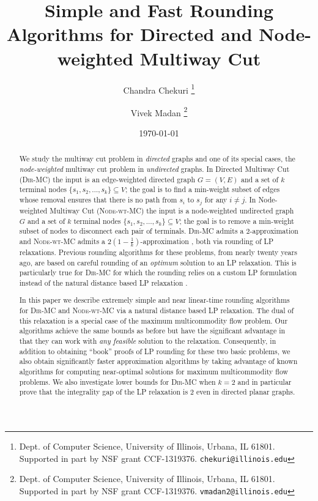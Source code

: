 \documentclass[11pt]{article}
\def\DirMC{\textsc{Dir-MC}\xspace}
\def\NodeMC{\textsc{Node-wt-MC}\xspace}
\def\NodeMC{\textsc{Node-wt-MC}\xspace}
\begin{document}
\title{Simple and Fast Rounding Algorithms for Directed and Node-weighted Multiway Cut}

\author{
Chandra Chekuri
\thanks{
Dept. of Computer Science, University of Illinois, Urbana, IL 61801.
Supported in part by NSF grant CCF-1319376. {\tt chekuri@illinois.edu}}
\and
Vivek Madan
\thanks{
Dept. of Computer Science, University of Illinois, Urbana, IL 61801.
Supported in part by NSF grant CCF-1319376.
{\tt vmadan2@illinois.edu}}
}

\date{\today}

\maketitle

\thispagestyle{empty}
\begin{abstract}
  We study the multiway cut problem in {\em directed} graphs and one
  of its special cases, the {\em node-weighted} multiway cut problem
  in {\em undirected} graphs.  In {\sc Directed Multiway Cut} (\DirMC)
  the input is an edge-weighted directed graph $G=(V,E)$ and a set of
  $k$ terminal nodes $\{s_1,s_2,\ldots,s_k\} \subseteq V$; the goal is
  to find a min-weight subset of edges whose removal ensures that there
  is no path from $s_i$ to $s_j$ for any $i \neq j$. In {\sc
    Node-weighted Multiway Cut} (\NodeMC) the input is a node-weighted
  undirected graph $G$ and a set of $k$ terminal nodes
  $\{s_1,s_2,\ldots,s_k\} \subseteq V$; the goal is to remove a
  min-weight subset of nodes to disconnect each pair of
  terminals. \DirMC admits a $2$-approximation \cite{NaorZ01}
  and \NodeMC admits a $2(1-\frac{1}{k})$-approximation
  \cite{GargVY04}, both via rounding of LP relaxations.
  Previous rounding algorithms for these problems, from nearly twenty
  years ago, are based on careful rounding of an {\em
    optimum} solution to an LP relaxation. This is particularly true
  for \DirMC for which the rounding relies on a custom LP formulation
  instead of the natural distance based LP relaxation \cite{NaorZ01}.

  In this paper we describe extremely simple and near linear-time
  rounding algorithms for \DirMC and \NodeMC via a natural distance
  based LP relaxation. The dual of this relaxation is a special case
  of the maximum  multicommodity flow problem. Our
  algorithms achieve the same bounds as before but have the
  significant advantage in that they can work with {\em any feasible}
  solution to the relaxation. Consequently, in addition to obtaining
  ``book'' proofs of LP rounding for these two basic problems, we also
  obtain significantly faster approximation algorithms by taking
  advantage of known algorithms for computing near-optimal solutions
  for maximum multicommodity flow problems. We also investigate 
  lower bounds for \DirMC when $k=2$ and in particular prove that
  the integrality gap of the LP relaxation is $2$ even in directed
  planar graphs.
\end{abstract}
\end{document}
